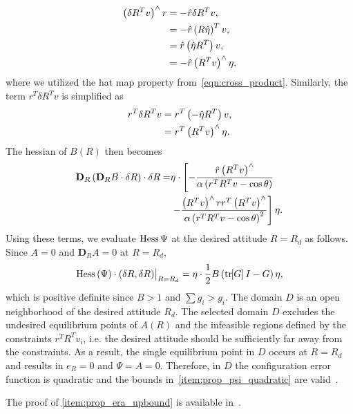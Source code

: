 \documentclass[10pt,fleqn]{IJCAS}  %
\begin{document}
\begin{multicols}{2}
\begin{align*}
    \left( \delta R^T v \right)^\wedge r &= - \hat{r} \delta R ^T v , \\
    &= - \hat{r} \left( R \hat \eta \right)^T v , \\
    &= \hat{r} \left( \hat{\eta} R^T  \right) v , \\
    &= - \hat{r} \left( R^T v \right)^\wedge \eta ,
\end{align*}
where we utilized the hat map property from~\cref{eqn:cross_product}.
Similarly, the term \( r^T \delta R^T v \) is simplified as
\begin{align*}
    r^T \delta R^T v &= r^T \left( -\hat \eta R^T \right)v , \\
    &= r^T \left( R^T v \right)^\wedge \eta .
\end{align*}
The hessian of \( B(R) \) then becomes
\begin{align*}
    \mathbf{D}_{R} \left( \mathbf{D}_{R} B \cdot \delta R \right) \cdot \delta R =& \eta \cdot \left[ - \frac{ \hat r \left( R^T v \right)^\wedge}{\alpha \left( r^T R^T v - \cos \theta \right)} \right. \\ 
    & \left. - \frac{\left( R^T v \right)^\wedge r r^T \left( R^T v \right)^\wedge }{ \alpha\left( r^T R^T v - \cos \theta \right)^2}  \right] \eta .
\end{align*}
Using these terms, we evaluate \( \mathrm{Hess} \, \Psi \) at the desired attitude \( R = R_d \) as follows. Since $A=0$ and $\mathbf{D}_R A=0$ at $R=R_d$, 
\begin{align*}
    \Hess(\Psi)\cdot (\delta R,\delta R)\big|_{R=R_d} = \eta \cdot \frac{1}{2} B \parenth{\tr{G}I -  G} \eta , 
\end{align*}
which is positive definite since \( B > 1\) and \( \sum g_i > g_i\). 
The domain \( D \) is an open neighborhood of the desired attitude \( R_d \).
The selected domain \( D \) excludes the undesired equilibrium points of \( A(R) \) and the infeasible regions defined by the constraints \( r^T R^T v_i \), i.e. the desired attitude should be sufficiently far away from the constraints. 
As a result, the single equilibrium point in \( D \) occurs at \( R=R_d\) and results in \( e_R = 0 \) and \( \Psi = A = 0\).
Therefore, in \( D \) the configuration error function is quadratic and the bounds in~\cref{item:prop_psi_quadratic} are valid~\cite[Proposition 6.30]{bullo2004}.

The proof of \cref{item:prop_era_upbound} is available in~\cite{LeeITCST13}.


\end{multicols}
\end{document}
